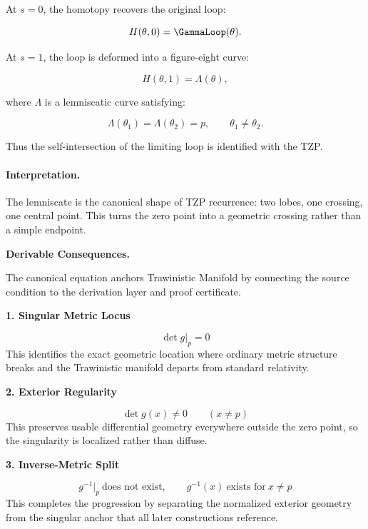 At $s=0$, the homotopy recovers the original loop:

\begin{equation}
H(\theta,0)=\GammaLoop(\theta).
\end{equation}

At $s=1$, the loop is deformed into a figure-eight curve:

\begin{equation}
H(\theta,1)=\Lambda(\theta),
\end{equation}

where $\Lambda$ is a lemniscatic curve satisfying:

\begin{equation}
\Lambda(\theta_1)=\Lambda(\theta_2)=p,
\qquad
\theta_1\neq\theta_2 .
\end{equation}

Thus the self-intersection of the limiting loop is identified with the TZP.

\paragraph{Interpretation.}
The lemniscate is the canonical shape of TZP recurrence: two lobes, one crossing, one central point. This turns the zero point into a geometric crossing rather than a simple endpoint.

\par\vspace{0.35em}
\noindent\textbf{Derivable Consequences.}\quad
\begingroup
\footnotesize
\raggedright
The canonical equation anchors Trawinistic Manifold by connecting the source condition to the derivation layer and proof certificate.
\par\endgroup

\noindent\textbf{1. Singular Metric Locus}\par
\[
\det g\vert_{p}=0
\]
\noindent This identifies the exact geometric location where ordinary metric structure breaks and the Trawinistic manifold departs from standard relativity.\par
\noindent\textbf{2. Exterior Regularity}\par
\[
\det g(x)\neq 0 \qquad (x\neq p)
\]
\noindent This preserves usable differential geometry everywhere outside the zero point, so the singularity is localized rather than diffuse.\par
\noindent\textbf{3. Inverse-Metric Split}\par
\[
g^{-1}\vert_{p}\ \text{does not exist},
\qquad
g^{-1}(x)\ \text{exists for}\ x\neq p
\]
\noindent This completes the progression by separating the normalized exterior geometry from the singular anchor that all later constructions reference.\par

